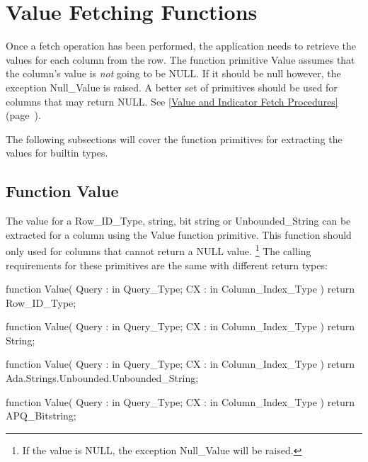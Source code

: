\documentclass[english,letterpaper]{book}
\newcommand\Ref[1]{\textsection\ref{#1} (page~\pageref{#1})}
\begin{document}
\section{Value Fetching Functions\label{Value Fetching Functions}}

Once a fetch operation has been performed, the application needs to
retrieve the values for each column from the row. The function primitive
Value assumes that the column's value is \emph{not} going
to be NULL. If it should be null however, the exception
Null\_Value is raised. A better set of primitives should be used for
columns that may return NULL. See \Ref{Value and Indicator Fetch Procedures}.

The following subsections will cover the function primitives for extracting
the values for builtin types.


\subsection{Function Value\label{Standard Value Functions}}

The value for a Row\_ID\_Type, string, bit string or
Unbounded\_String can be extracted for a column
using the Value function primitive. This function should only used
for columns that cannot return a NULL value.%
\footnote{If the value is NULL, the exception Null\_Value will be raised.%
} The calling requirements for these primitives are the same with 
different return types:

\begin{Code}
function Value(
   Query : in Query_Type;
   CX :    in Column_Index_Type
) return Row_ID_Type;
\end{Code}

\begin{Code}
function Value(
   Query : in Query_Type;
   CX :    in Column_Index_Type
) return String;
\end{Code}

\begin{Code}
function Value(
   Query : in Query_Type;
   CX :    in Column_Index_Type
) return Ada.Strings.Unbounded.Unbounded_String;
\end{Code}

\begin{Code}
function Value(
   Query : in Query_Type;
   CX :    in Column_Index_Type
) return APQ_Bitstring;
\end{Code}
\end{document}
